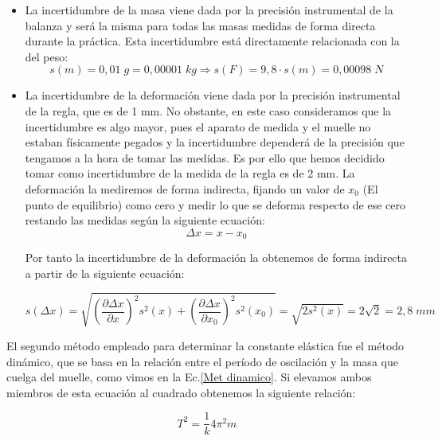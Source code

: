 \documentclass[a4paper,12pt,titlepage]{article}
\begin{document}
\begin{itemize}
    \item La incertidumbre de la masa viene dada por la precisión instrumental de la balanza y será la misma para todas las masas medidas de forma directa durante la práctica. Esta incertidumbre está directamente relacionada con la del peso:
    \begin{equation}
        s(m) = 0,01 \; g = 0,00001 \; kg \Rightarrow s(F) =9,8\cdot s(m) = 0,00098 \; N
        \label{Inc peso}
    \end{equation}
    \item La incertidumbre de la deformación viene dada por la precisión instrumental de la regla, que es de 1 mm. No obstante, en este caso consideramos que la incertidumbre es algo mayor, pues el aparato de medida y el muelle no estaban físicamente pegados y la incertidumbre dependerá de la precisión que tengamos a la hora de tomar las medidas. Es por ello que hemos decidido tomar como incertidumbre de la medida de la regla es de 2 mm. La deformación la mediremos de forma indirecta, fijando un valor de $x_0$ (El punto de equilibrio) como cero y medir lo que se deforma respecto de ese cero restando las medidas según la siguiente ecuación:
    \begin{equation}
        \Delta x = x - x_0
        \label{Deformación}
    \end{equation}

    Por tanto la incertidumbre de la deformación la obtenemos de forma indirecta a partir de la siguiente ecuación:

    \begin{equation}
        s(\Delta x) = \sqrt{\left (\frac{\partial \Delta x}{\partial x}\right )^2s^2(x) + \left (\frac{\partial \Delta x}{\partial x_0}\right )^2s^2(x_0)} = \sqrt{2s^2(x)} = 2\sqrt{2} = 2,8 \; mm
        \label{Inc deformacion}
    \end{equation}
\end{itemize}

El segundo método empleado para determinar la constante elástica fue el método dinámico, que se basa en la relación entre el período de oscilación y la masa que cuelga del muelle, como vimos en la Ec.\ref{Met dinamico}. Si elevamos ambos miembros de esta ecuación al cuadrado obtenemos la siguiente relación:

\begin{equation}
    T^2 = \frac{1}{k} 4 \pi^2 m
\end{equation}
\end{document}
